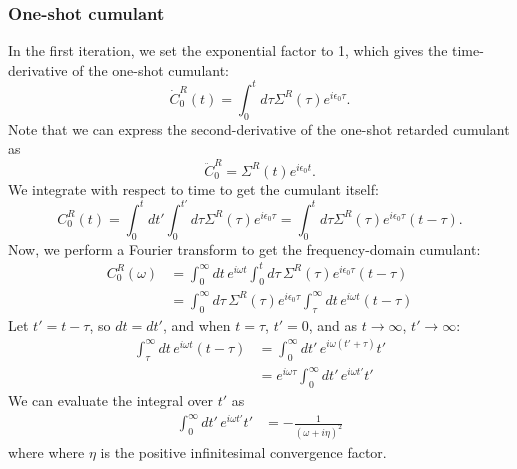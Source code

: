 \subsubsection{One-shot cumulant}
In the first iteration, we set the exponential factor to 1, which gives the time-derivative of the one-shot cumulant:
\begin{equation}
    \dot{C}^{R}_0(t)=\int_0^t d \tau \Sigma^R(\tau) e^{i \epsilon_0 \tau} .
\end{equation}
Note that we can express the second-derivative of the one-shot retarded cumulant as
\begin{equation}
    \ddot{C}^{R}_0= \Sigma^R(t) e^{i \epsilon_0 t} .
\end{equation}
We integrate with respect to time to get the cumulant itself:
\begin{equation}
    C^{R}_0(t)=\int_0^t d t' \int_0^{t'} d \tau \Sigma^R(\tau) e^{i \epsilon_0 \tau} = \int_0^t d \tau \Sigma^R(\tau) e^{i \epsilon_0 \tau} (t-\tau) .
\end{equation}
Now, we perform a Fourier transform to get the frequency-domain cumulant:
\begin{align}
    C^{R}_0(\omega) &= \int_0^\infty dt\, e^{i\omega t} \int_0^t d\tau\, \Sigma^R(\tau) e^{i\epsilon_0 \tau} (t-\tau) \\
    &= \int_0^\infty d\tau\, \Sigma^R(\tau) e^{i\epsilon_0 \tau} \int_\tau^\infty dt\, e^{i\omega t} (t-\tau)
\end{align}
Let $t' = t - \tau$, so $dt = dt'$, and when $t = \tau$, $t' = 0$, and as $t \to \infty$, $t' \to \infty$:
\begin{align}
    \int_\tau^\infty dt\, e^{i\omega t} (t-\tau) &= \int_0^\infty dt'\, e^{i\omega (t'+\tau)} t' \\
    &= e^{i\omega \tau} \int_0^\infty dt'\, e^{i\omega t'} t'
\end{align}
We can evaluate the integral over $t'$ as
\begin{align}
    \int_0^\infty dt'\, e^{i\omega t'} t' & = -\frac{1}{(\omega + i\eta)^2}
\end{align}
where where $\eta$ is the positive infinitesimal convergence factor.

